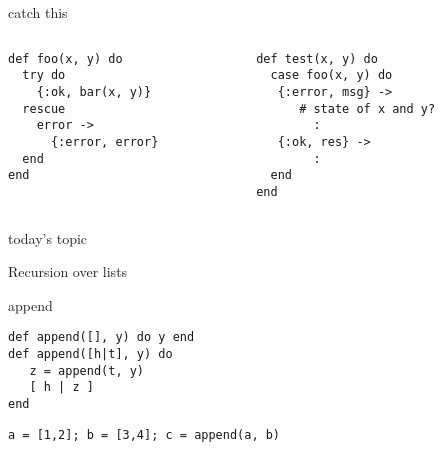 \begin{frame}[fragile]{catch this}

\begin{columns}
 \begin{column}{0.5\linewidth}
\begin{verbatim}
def foo(x, y) do
  try do
    {:ok, bar(x, y)}
  rescue
    error ->
      {:error, error}
  end
end
\end{verbatim}
 \end{column}\pause
 \begin{column}{0.5\linewidth}
\begin{verbatim}
def test(x, y) do
  case foo(x, y) do 
   {:error, msg} ->  
      # state of x and y?
        :        
   {:ok, res} -> 
        :
  end
end
\end{verbatim}
 \end{column}
\end{columns}

\end{frame}

\begin{frame}{today's topic}

\vspace{60pt}\hspace{80pt}Recursion over lists

\end{frame}

\begin{frame}[fragile]{append}

\begin{verbatim}
def append([], y) do y end
def append([h|t], y) do
   z = append(t, y)
   [ h | z ]
end
\end{verbatim}

\pause
\begin{verbatim}
a = [1,2]; b = [3,4]; c = append(a, b)
\end{verbatim}

\pause


\end{frame}



